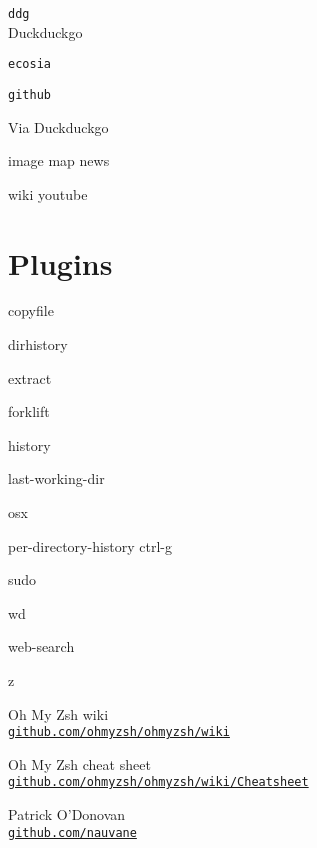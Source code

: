 \documentclass[a4paper,landscape,columns=3]{cheatsheet}
\newcommand{\code}{\texttt}
\newcommand{\codequiv}{\dsm}
\begin{document}
\code{ddg}\\
Duckduckgo

\code{ecosia}

\code{github}

Via Duckduckgo

\ttfamily

image \qquad map \qquad news

wiki \qquad youtube

\columnbreak

\section{Plugins}

copyfile

dirhistory 

extract

forklift

history

last-working-dir

osx

per-directory-history {\codequiv{(}}ctrl-g{\codequiv{)}}

sudo

wd

web-search 

z

\columnbreak

\sffamily

Oh My Zsh wiki\\
{\code{\href{https://github.com/ohmyzsh/ohmyzsh/wiki}{github.com/ohmyzsh/ohmyzsh/wiki}}}

\sffamily

Oh My Zsh cheat sheet\\
{\code{\href{https://github.com/ohmyzsh/ohmyzsh/wiki/Cheatsheet}{github.com/ohmyzsh/ohmyzsh/wiki/Cheatsheet}}}

Patrick O'Donovan\\
{\code{\href{https://github.com/nauvane}{github.com/nauvane}}}
\end{document}

